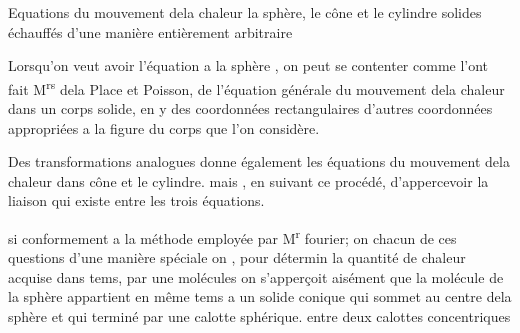 \documentclass[11pt,a4paper]{article}
\begin{document}

Equations du mouvement dela chaleur  la sphère,  le cône
et le cylindre solides échauffés d'une manière entièrement
arbitraire

Lorsqu'on veut avoir l'équation   a la
 sphère  , on peut se contenter comme l'ont fait
M\textsuperscript{rs} dela Place et Poisson, de    l'équation 
générale du mouvement dela chaleur dans un corps solide, en y
    
 des coordonnées rectangulaires d'autres coordonnées
appropriées a la figure du corps que l'on considère.

Des transformations  analogues donne également les
équations du mouvement dela chaleur dans  cône et  le cylindre.
mais , en suivant ce procédé,  d'appercevoir
la liaison qui existe entre les trois équations. \ill{}

 si   conformement a la méthode employée
 par M\textsuperscript{r} fourier; on    chacun  de
 ces questions d'une manière spéciale on 
 , pour 
   détermin \struck{\ill{}} la quantité de chaleur
acquise   dans   tems, par une 
molécules    on s'apperçoit
aisément que la molécule de la sphère appartient en
même tems a un solide conique qui    sommet
au centre dela sphère et qui   terminé par une
calotte sphérique.     entre deux 
 calottes concentriques    
 
\end{document}
